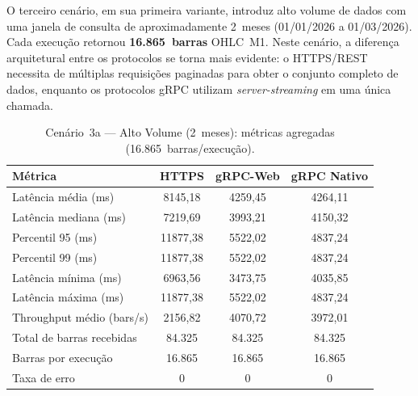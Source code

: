 O terceiro cenário, em sua primeira variante, introduz alto volume de dados
com uma janela de consulta de aproximadamente 2~meses (01/01/2026 a
01/03/2026). Cada execução retornou \textbf{16.865~barras} OHLC~M1. Neste
cenário, a diferença arquitetural entre os protocolos se torna mais evidente:
o HTTPS/REST necessita de múltiplas requisições paginadas para obter o
conjunto completo de dados, enquanto os protocolos gRPC utilizam
\textit{server-streaming} em uma única chamada.

\begin{table}[H]
  \centering
  \caption{Cenário~3a — Alto Volume (2~meses): métricas agregadas
    (16.865~barras/execução).}
  \label{tab:cenario3a-summary}
  \begin{tabular}{l S[table-format=5.2] S[table-format=5.2] S[table-format=5.2]}
    \toprule
    \textbf{Métrica} & {\textbf{HTTPS}} & {\textbf{gRPC-Web}} & {\textbf{gRPC Nativo}} \\
    \midrule
    Latência média (ms)        & 8145,18 & 4259,45 & 4264,11 \\
    Latência mediana (ms)      & 7219,69 & 3993,21 & 4150,32 \\
    Percentil 95 (ms)          & 11877,38 & 5522,02 & 4837,24 \\
    Percentil 99 (ms)          & 11877,38 & 5522,02 & 4837,24 \\
    Latência mínima (ms)       & 6963,56 & 3473,75 & 4035,85 \\
    Latência máxima (ms)       & 11877,38 & 5522,02 & 4837,24 \\
    Throughput médio (bars/s)  & 2156,82 & 4070,72 & 3972,01 \\
    Total de barras recebidas  & {84.325}   & {84.325}   & {84.325}   \\
    Barras por execução        & {16.865}   & {16.865}   & {16.865}   \\
    Taxa de erro               & {0}       & {0}       & {0}       \\
    \bottomrule
  \end{tabular}
\end{table}
